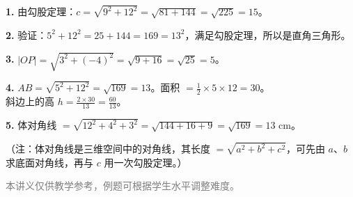 \documentclass[12pt, a4paper]{ctexart}
\begin{document}
\vspace{10pt}

\begin{knowledgebox}[参考答案]
\textbf{1.} 由勾股定理：$c = \sqrt{9^2 + 12^2} = \sqrt{81+144} = \sqrt{225} = 15$。

\vspace{4pt}
\textbf{2.} 验证：$5^2 + 12^2 = 25 + 144 = 169 = 13^2$，满足勾股定理，所以是直角三角形。

\vspace{4pt}
\textbf{3.} $|OP| = \sqrt{3^2 + (-4)^2} = \sqrt{9+16} = \sqrt{25} = 5$。

\vspace{4pt}
\textbf{4.} $AB = \sqrt{5^2 + 12^2} = \sqrt{169} = 13$。面积 $= \frac{1}{2} \times 5 \times 12 = 30$。\\
斜边上的高 $h = \frac{2 \times 30}{13} = \frac{60}{13}$。

\vspace{4pt}
\textbf{5.} 体对角线 $= \sqrt{12^2 + 4^2 + 3^2} = \sqrt{144 + 16 + 9} = \sqrt{169} = 13$ cm。

（注：体对角线是三维空间中的对角线，其长度 $= \sqrt{a^2+b^2+c^2}$，可先由 $a$、$b$ 求底面对角线，再与 $c$ 用一次勾股定理。）
\end{knowledgebox}

\vfill
\begin{center}
\small\textcolor{gray}{本讲义仅供教学参考，例题可根据学生水平调整难度。}
\end{center}
\end{document}

